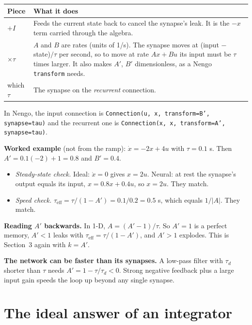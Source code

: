 \documentclass[11pt,letterpaper]{article}
\begin{document}
\begin{center}
\begin{tabular}{@{}p{}p{}@{}}
\toprule
Piece & What it does \\
\midrule
$+I$ & Feeds the current state back to cancel the synapse's leak. It is the $-x$ term carried through the algebra. \\
$\times\tau$ & $A$ and $B$ are rates (units of 1/s). The synapse moves at (input $-$ state)$/\tau$ per second, so to move at rate $Ax + Bu$ its input must be $\tau$ times larger. It also makes $A'$, $B'$ dimensionless, as a Nengo \texttt{transform} needs. \\
which $\tau$ & The synapse on the \emph{recurrent} connection. \\
\bottomrule
\end{tabular}
\end{center}

In Nengo, the input connection is \texttt{Connection(u, x, transform=B', synapse=tau)} and the recurrent one is \texttt{Connection(x, x, transform=A', synapse=tau)}.

\textbf{Worked example} (not from the ramp): $\dot x = -2x + 4u$ with $\tau = 0.1$ s. Then $A' = 0.1(-2) + 1 = 0.8$ and $B' = 0.4$.
\begin{itemize}
\item \emph{Steady-state check.} Ideal: $\dot x = 0$ gives $x = 2u$. Neural: at rest the synapse's output equals its input, $x = 0.8x + 0.4u$, so $x = 2u$. They match.
\item \emph{Speed check.} $\tau_{\mathrm{eff}} = \tau/(1 - A') = 0.1/0.2 = 0.5$ s, which equals $1/|A|$. They match.
\end{itemize}

\textbf{Reading $A'$ backwards.} In 1-D, $A = (A' - 1)/\tau$. So $A' = 1$ is a perfect memory, $A' < 1$ leaks with $\tau_{\mathrm{eff}} = \tau/(1 - A')$, and $A' > 1$ explodes. This is Section~3 again with $k = A'$.

\textbf{The network can be faster than its synapses.} A low-pass filter with $\tau_d$ shorter than $\tau$ needs $A' = 1 - \tau/\tau_d < 0$. Strong negative feedback plus a large input gain speeds the loop up beyond any single synapse.

\section{The ideal answer of an integrator}
\end{document}
